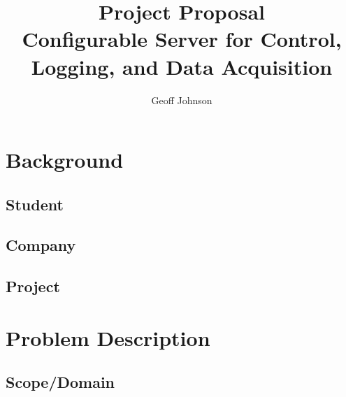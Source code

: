 \documentclass[11pt]{article}
\begin{document}
\nocite{*}

  \title{
    Project Proposal \\
    Configurable Server for Control, Logging, and Data Acquisition
  }

  \author{
    Geoff Johnson
  }

  \renewcommand{\today}{January 1, 2014}
  \maketitle
  \thispagestyle{empty}
  \newpage
  \mbox{}
  \thispagestyle{empty}

  \newpage
  \addtocounter{page}{-1}
  \tableofcontents

  \newpage


  \section{Background}
    \label{sec:bg}

    \subsection{Student}
      \label{sec:bg-student}

    \subsection{Company}
      \label{sec:bg-company}

    \subsection{Project}
      \label{sec:bg-project}

  \section{Problem Description}
    \label{sec:desc}

    \subsection{Scope/Domain}
      \label{sec:desc-domain}
\end{document}
